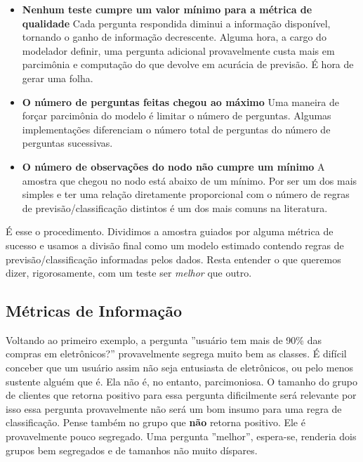 \begin{itemize}
    \item \textbf{Nenhum teste cumpre um valor mínimo para a métrica de qualidade} \newline Cada pergunta respondida diminui a informação disponível, tornando o ganho de informação decrescente. Alguma hora, a cargo do modelador definir, uma pergunta adicional provavelmente custa mais em parcimônia e computação do que devolve em acurácia de previsão. É hora de gerar uma folha.
    
    \item \textbf{O número de perguntas feitas chegou ao máximo} \newline
    Uma maneira de forçar parcimônia do modelo é limitar o número de perguntas. Algumas implementações diferenciam o número total de perguntas do número de perguntas sucessivas.  
    
    \item \textbf{O número de observações do nodo não cumpre um mínimo} \newline 
    A amostra que chegou no nodo está abaixo de um mínimo. Por ser um dos mais simples e ter uma relação diretamente proporcional com o número de regras de previsão/classificação distintos é um dos mais comuns na literatura.
\end{itemize}

É esse o procedimento. Dividimos a amostra guiados por alguma métrica de sucesso e usamos a divisão final como um modelo estimado contendo regras de previsão/classificação informadas pelos dados. Resta entender o que queremos dizer, rigorosamente, com um teste ser \textit{melhor} que outro.


\subsection{Métricas de Informação}

Voltando ao primeiro exemplo, a pergunta ''usuário tem mais de 90\% das compras em eletrônicos?'' provavelmente segrega muito bem as classes. É difícil conceber que um usuário assim não seja entusiasta de eletrônicos, ou pelo menos sustente alguém que é. Ela não é, no entanto, parcimoniosa. O tamanho do grupo de clientes que retorna positivo para essa pergunta dificilmente será relevante por isso essa pergunta provavelmente não será um bom insumo para uma regra de classificação. Pense também no grupo que \textbf{não} retorna positivo. Ele é provavelmente pouco segregado. Uma pergunta ''melhor'', espera-se, renderia dois grupos bem segregados e de tamanhos não muito díspares. 

